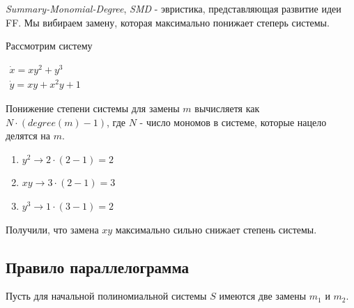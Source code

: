 \begin{heuristics} \label{heur:AEQD}
    \textit{Summary-Monomial-Degree}, \textit{SMD} - эвристика, представляющая развитие идеи FF. Мы вибираем замену, которая максимально понижает степерь системы.
    
    \begin{example}
        Рассмотрим систему
        
        $\begin{array}{lcl}
             \dot x = xy^2 + y^3 \\
             \dot y = xy + x^2 y + 1
        \end{array}$
        \newline
        
        Понижение степени системы для замены $m$ вычисляетя как $N \cdot (degree(m) - 1)$, где $N$ - число мономов в системе, которые нацело делятся на $m$.
        \begin{enumerate}
            \item $y^2 \longrightarrow 2 \cdot (2 - 1) = 2$
            \item $xy \longrightarrow 3 \cdot (2 - 1) = 3$
            \item $y^3 \longrightarrow 1 \cdot (3 - 1) = 2$
        \end{enumerate}
        Получили, что замена $xy$ максимально сильно снижает степень системы.
    \end{example}
\end{heuristics}

\subsection{Правило параллелограмма} \label{sec:parallel-rule}

Пусть для начальной полиномиальной системы $S$ имеются две замены $m_1$ и $m_2$.


